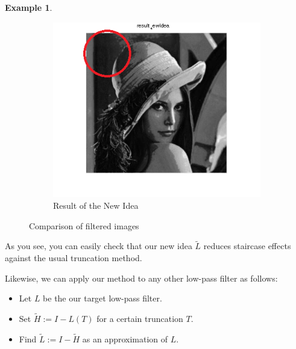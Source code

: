 \documentclass[12pt]{amsart}
\theoremstyle{definition}
\newtheorem{ex}[thm]{Example}
\theoremstyle{remark}
\numberwithin{thm}{section}
\begin{document}
\begin{ex}
\begin{figure}[h]
\begin{subfigure}[b]{0.3\textwidth} \includegraphics[width=\textwidth]{new.png} \caption{Result of the New Idea} \label{fig:new} \end{subfigure}
\caption{Comparison of filtered images}\label{fig:comp} 
\end{figure}

As you see, you can easily check that our new idea $\tilde{L}$ reduces staircase effects against the usual truncation method.
\end{ex}

Likewise, we can apply our method to any other low-pass filter as follows:

\begin{itemize}
\item[1.] Let $L$ be the our target low-pass filter.
\item[2.] Set $\tilde{H}:=I-L(T)$ for a certain truncation $T$.
\item[3.] Find $\tilde{L}:=I-\tilde{H}$ as an approximation of $L$.
\end{itemize}

\end{document}
